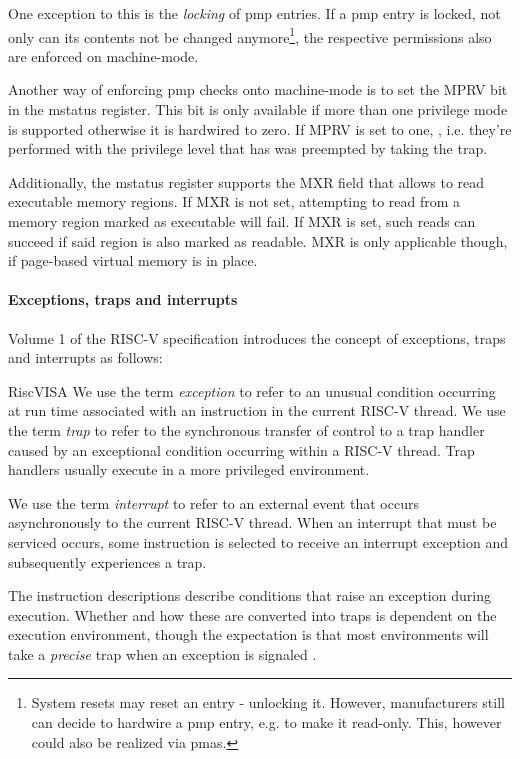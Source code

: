 One exception to this is the \textit{locking} of \gls{pmp} entries.
If a \gls{pmp} entry is locked, not only can its contents not be changed anymore\footnote{%
    System resets may reset an entry - unlocking it.
    However, manufacturers still can decide to hardwire a \gls{pmp} entry, e.g. to make it read-only.
    This, however could also be realized via \glspl{pma}.
}, the respective permissions also are enforced on machine-mode.

Another way of enforcing \gls{pmp} checks onto machine-mode is to set the MPRV bit in the \gls{mstatus} register.
This bit is only available if more than one privilege mode is supported otherwise it is hardwired to zero.
If MPRV is set to one, , i.e. they're performed with the privilege level that has was preempted by taking the trap.

Additionally, the \gls{mstatus} register supports the MXR field that allows to read executable memory regions.
If MXR is not set, attempting to read from a memory region marked as executable will fail.
If MXR is set, such reads can succeed if said region is also marked as readable.
MXR is only applicable though, if page-based virtual memory is in place.

\paragraph{Exceptions, traps and interrupts}

Volume 1 of the RISC-V specification \cite{RiscVISA} introduces the concept of exceptions, traps and interrupts as follows:
\begin{displaycquote}{RiscVISA}
    We use the term \textit{exception} to refer to an unusual condition occurring at run time associated with an instruction in the current RISC-V thread.
    We use the term \textit{trap} to refer to the synchronous transfer of control to a trap handler caused by an exceptional condition occurring within a RISC-V thread.
    Trap handlers usually execute in a more privileged environment.

    We use the term \textit{interrupt} to refer to an external event that occurs asynchronously to the current RISC-V thread.
    When an interrupt that must be serviced occurs, some instruction is selected to receive an interrupt exception and subsequently experiences a trap.

    The instruction descriptions \textelp{} describe conditions that raise an exception during execution.
    Whether and how these are converted into traps is dependent on the execution environment, though the expectation is that most environments will take a \textit{precise} trap when an exception is signaled \textelp{}.
\end{displaycquote}

